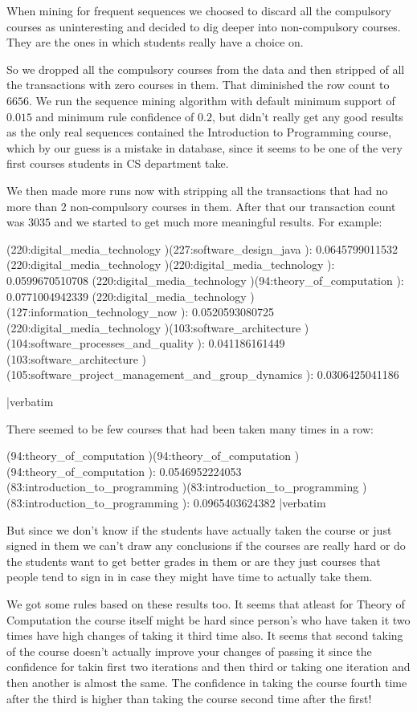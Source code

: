 When mining for frequent sequences we choosed to discard all the compulsory courses as uninteresting and
decided to dig deeper into non-compulsory courses. They are the ones in which students really have a choice on.

So we dropped all the compulsory courses from the data and then stripped of all the transactions with zero 
courses in them. That diminished the row count to $6656$. We run the sequence mining algorithm with default 
minimum support of $0.015$ and minimum rule confidence of $0.2$, but didn't really get any good results as the
only real sequences contained the Introduction to Programming course, which by our guess is a mistake in database,
since it seems to be one of the very first courses students in CS department take.

We then made more runs now with stripping all the transactions that had no more than 2 non-compulsory courses in them.
After that our transaction count was $3035$ and we started to get much more meaningful results. For example:

\verbatim
(220:digital_media_technology )(227:software_design_java ): 0.0645799011532
(220:digital_media_technology )(220:digital_media_technology ): 0.0599670510708
(220:digital_media_technology )(94:theory_of_computation ): 0.0771004942339
(220:digital_media_technology )(127:information_technology_now ): 0.0520593080725
(220:digital_media_technology )(103:software_architecture )(104:software_processes_and_quality ): 0.041186161449
(103:software_architecture )(105:software_project_management_and_group_dynamics ): 0.0306425041186

|verbatim

There seemed to be few courses that had been taken many times in a row:

\verbatim
(94:theory_of_computation )(94:theory_of_computation )(94:theory_of_computation ): 0.0546952224053
(83:introduction_to_programming )(83:introduction_to_programming )(83:introduction_to_programming ): 0.0965403624382
|verbatim

But since we don't know if the students have actually taken the course or just signed in them we can't draw any
conclusions if the courses are really hard or do the students want to get better grades in them or are they just
courses that people tend to sign in in case they might have time to actually take them. 

We got some rules based on these results too. It seems that atleast for Theory of Computation the course itself
might be hard since person's who have taken it two times have high changes of taking it third time also. It seems 
that second taking of the course doesn't actually improve your changes of passing it since the confidence for
takin first two iterations and then third or taking one iteration and then another is almost the same. The 
confidence in taking the course fourth time after the third is higher than taking the course second time 
after the first!

